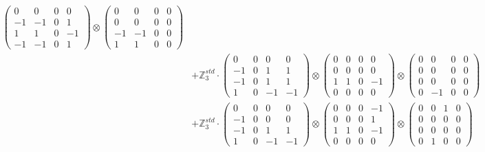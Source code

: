 \documentclass{article}
\begin{document}
{\begin{align}
            \begin{pmatrix} 0 & 0 & 0 & 0 \\ -1 & -1 & 0 & 1 \\ 1 & 1 & 0 & -1 \\ -1 & -1 & 0 & 1 \end{pmatrix} \otimes 
            \begin{pmatrix} 0 & 0 & 0 & 0 \\ 0 & 0 & 0 & 0 \\ -1 & -1 & 0 & 0 \\ 1 & 1 & 0 & 0 \end{pmatrix} \\ 
        &+ \label{Rs16-Rc11-Solution-18-c20} \mathbb{Z}_3^{std} \cdot 
            \begin{pmatrix} 0 & 0 & 0 & 0 \\ -1 & 0 & 1 & 1 \\ -1 & 0 & 1 & 1 \\ 1 & 0 & -1 & -1 \end{pmatrix} \otimes 
            \begin{pmatrix} 0 & 0 & 0 & 0 \\ 0 & 0 & 0 & 0 \\ 1 & 1 & 0 & -1 \\ 0 & 0 & 0 & 0 \end{pmatrix} \otimes 
            \begin{pmatrix} 0 & 0 & 0 & 0 \\ 0 & 0 & 0 & 0 \\ 0 & 0 & 0 & 0 \\ 0 & -1 & 0 & 0 \end{pmatrix} \\ 
        &+ \label{Rs16-Rc11-Solution-18-c21} \mathbb{Z}_3^{std} \cdot 
            \begin{pmatrix} 0 & 0 & 0 & 0 \\ -1 & 0 & 0 & 0 \\ -1 & 0 & 1 & 1 \\ 1 & 0 & -1 & -1 \end{pmatrix} \otimes 
            \begin{pmatrix} 0 & 0 & 0 & -1 \\ 0 & 0 & 0 & 1 \\ 1 & 1 & 0 & -1 \\ 0 & 0 & 0 & 0 \end{pmatrix} \otimes 
            \begin{pmatrix} 0 & 0 & 1 & 0 \\ 0 & 0 & 0 & 0 \\ 0 & 0 & 0 & 0 \\ 0 & 1 & 0 & 0 \end{pmatrix} \\ 

\end{align}}
\end{document}
